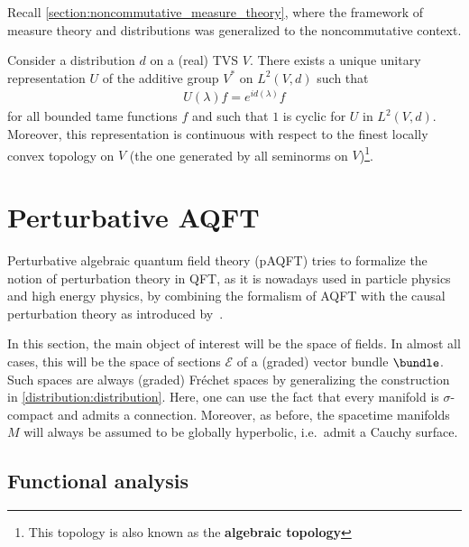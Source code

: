     Recall \cref{section:noncommutative_measure_theory}, where the framework of measure theory and distributions was generalized to the noncommutative context.
    \begin{property}
        Consider a distribution $d$ on a (real) TVS $V$. There exists a unique unitary representation $U$ of the additive group $V^*$ on $L^2(V,d)$ such that
        \begin{gather}
            U(\lambda)f = e^{id(\lambda)}f
        \end{gather}
        for all bounded tame functions $f$ and such that $1$ is cyclic for $U$ in $L^2(V,d)$. Moreover, this representation is continuous with respect to the finest locally convex topology on $V$ (the one generated by all seminorms on $V$)\footnote{This topology is also known as the \textbf{algebraic topology}}. 
    \end{property}

\section{Perturbative AQFT}

    Perturbative algebraic quantum field theory (pAQFT) tries to formalize the notion of perturbation theory in QFT, as it is nowadays used in particle physics and high energy physics, by combining the formalism of AQFT with the causal perturbation theory as introduced by~\citet{epstein_role_1973}.

    In this section, the main object of interest will be the space of fields. In almost all cases, this will be the space of sections $\mathcal{E}$ of a (graded) vector bundle $\bundle$. Such spaces are always (graded) Fr\'echet spaces by generalizing the construction in \cref{distribution:distribution}. Here, one can use the fact that every manifold is $\sigma$-compact and admits a connection. Moreover, as before, the spacetime manifolds $M$ will always be assumed to be globally hyperbolic, i.e.~admit a Cauchy surface.

\subsection{Functional analysis}

